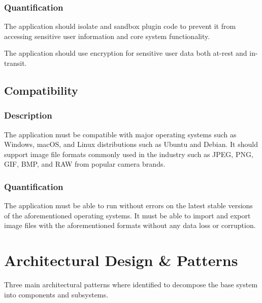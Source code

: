 \documentclass[11pt,a4paper]{article}
\begin{document}
\subsubsection*{Quantification}
The application should isolate and sandbox plugin code to prevent it from
accessing sensitive user information and core system functionality.

The application should use encryption for sensitive user data both at-rest and
in-transit. 

\subsection{Compatibility} 

\subsubsection*{Description}
The application must be compatible with major operating systems such as Windows,
macOS, and Linux distributions such as Ubuntu and Debian. It should support
image file formats commonly used in the industry such as JPEG, PNG, GIF, BMP,
and RAW from popular camera brands.

\subsubsection*{Quantification}
The application must be able to run without errors on the latest stable versions
of the aforementioned operating systems. It must be able to import and export
image files with the aforementioned formats without any data loss or corruption. 


\section{Architectural Design \& Patterns}
Three main architectural patterns where identified to decompose the base system
into components and subsystems.
\end{document}

